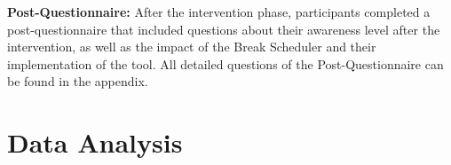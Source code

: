 \documentclass{hasel_thesis}
\begin{document}
\textbf{Post-Questionnaire:} After the intervention phase, participants completed a post-questionnaire that included questions about their awareness level after the intervention, as well as the impact of the Break Scheduler and their implementation of the tool. All detailed questions of the Post-Questionnaire can be found in the appendix.

\section{Data Analysis}
\begin{comment} 
- Explanation of the statistical methods used to analyze the data, including descriptive statistics, inferential statistics, and any other relevant techniques

The data analysis section of your study is where you describe the methods you used to analyze the data you collected. This section should include the following elements:

Data Cleaning: Describe any steps you took to clean the data, such as removing missing values, checking for outliers, or transforming variables.

Descriptive Statistics: Provide summary statistics for the demographic and pre- and post-intervention data, including means, standard deviations, frequencies, and ranges.

Inferential Statistics: Describe the inferential statistical methods you used to analyze the data and test your hypotheses. For example, if you were comparing the mean level of personal resource recharge between the intervention and control groups, you might use a paired t-test or a repeated measures ANOVA.

Results: Present the results of your statistical analysis in a clear and concise manner, including tables, figures, and effect sizes. Interpret the results in the context of your study, including any significant findings and their implications.

Limitations: Discuss any limitations or limitations of your study, including sources of bias, limitations of the data, or limitations of the statistical methods used.

Conclusion: Summarize the main findings of the study and provide implications for future research.

This section should be written in a clear, concise manner that is accessible to readers who may not have a strong background in statistics. Any statistical tests should be accompanied by an explanation of the test and its assumptions, as well as the results of the test and their implications.
\end{comment}
\end{document}
